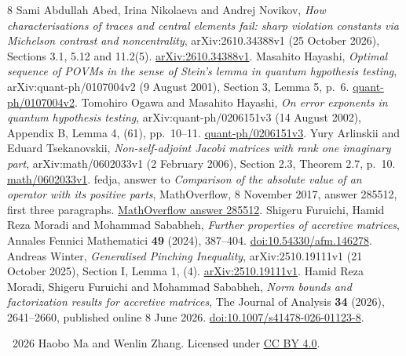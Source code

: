 \documentclass[11pt]{article}
\begin{document}
\begin{thebibliography}{8}
Sami Abdullah Abed, Irina Nikolaeva and Andrej Novikov,
\emph{How characterisations of traces and central elements fail:
sharp violation constants via Michelson contrast and noncentrality},
arXiv:2610.34388v1 (25 October 2026), Sections 3.1, 5.12 and 11.2(5).
\href{https://arxiv.org/abs/2610.34388v1}{arXiv:2610.34388v1}.
Masahito Hayashi,
\emph{Optimal sequence of POVMs in the sense of Stein's lemma in
quantum hypothesis testing}, arXiv:quant-ph/0107004v2 (9 August 2001),
Section 3, Lemma 5, p.~6.
\href{https://arxiv.org/abs/quant-ph/0107004v2}{quant-ph/0107004v2}.
Tomohiro Ogawa and Masahito Hayashi,
\emph{On error exponents in quantum hypothesis testing},
arXiv:quant-ph/0206151v3 (14 August 2002), Appendix B,
Lemma 4, (61), pp.~10--11.
\href{https://arxiv.org/abs/quant-ph/0206151v3}{quant-ph/0206151v3}.
Yury Arlinskii and Eduard Tsekanovskii,
\emph{Non-self-adjoint Jacobi matrices with rank one imaginary part},
arXiv:math/0602033v1 (2 February 2006), Section 2.3, Theorem 2.7, p.~10.
\href{https://arxiv.org/abs/math/0602033v1}{math/0602033v1}.
fedja, answer to \emph{Comparison of the absolute value of an operator
with its positive parts}, MathOverflow, 8 November 2017, answer 285512,
first three paragraphs.
\href{https://mathoverflow.net/a/285512}{MathOverflow answer 285512}.
Shigeru Furuichi, Hamid Reza Moradi and Mohammad Sababheh,
\emph{Further properties of accretive matrices},
Annales Fennici Mathematici \textbf{49} (2024), 387--404.
\href{https://doi.org/10.54330/afm.146278}{doi:10.54330/afm.146278}.
Andreas Winter,
\emph{Generalised Pinching Inequality},
arXiv:2510.19111v1 (21 October 2025), Section I, Lemma 1, (4).
\href{https://arxiv.org/abs/2510.19111v1}{arXiv:2510.19111v1}.
Hamid Reza Moradi, Shigeru Furuichi and Mohammad Sababheh,
\emph{Norm bounds and factorization results for accretive matrices},
The Journal of Analysis \textbf{34} (2026), 2641--2660,
published online 8 June 2026.
\href{https://doi.org/10.1007/s41478-026-01123-8}{doi:10.1007/s41478-026-01123-8}.
\end{thebibliography}
\medskip
\noindent\small\textcopyright\ 2026 Haobo Ma and Wenlin Zhang.
Licensed under \href{https://creativecommons.org/licenses/by/4.0/}{CC BY 4.0}.
\end{document}
